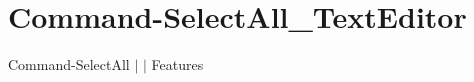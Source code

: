 \chapter{Command-\/\+Select\+All\+\_\+\+Text\+Editor }
\hypertarget{md__docs_2_text_editor_2_features_2_command-_select_all___text_editor}{}\label{md__docs_2_text_editor_2_features_2_command-_select_all___text_editor}
Command-\/\+Select\+All \texorpdfstring{$\vert$}{|}  \texorpdfstring{$\vert$}{|} Features



 